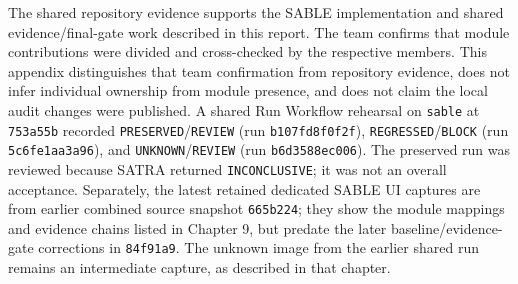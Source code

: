The shared repository evidence supports the SABLE implementation and shared evidence/final-gate work described in this report. The team confirms that module contributions were divided and cross-checked by the respective members. This appendix distinguishes that team confirmation from repository evidence, does not infer individual ownership from module presence, and does not claim the local audit changes were published.
A shared Run Workflow rehearsal on \texttt{sable} at \texttt{753a55b} recorded \texttt{PRESERVED}/\texttt{REVIEW} (run \texttt{b107fd8f0f2f}), \texttt{REGRESSED}/\texttt{BLOCK} (run \texttt{5c6fe1aa3a96}), and \texttt{UNKNOWN}/\texttt{REVIEW} (run \texttt{b6d3588ec006}). The preserved run was reviewed because SATRA returned \texttt{INCONCLUSIVE}; it was not an overall acceptance. Separately, the latest retained dedicated SABLE UI captures are from earlier combined source snapshot \texttt{665b224}; they show the module mappings and evidence chains listed in Chapter 9, but predate the later baseline/evidence-gate corrections in \texttt{84f91a9}. The unknown image from the earlier shared run remains an intermediate capture, as described in that chapter.
